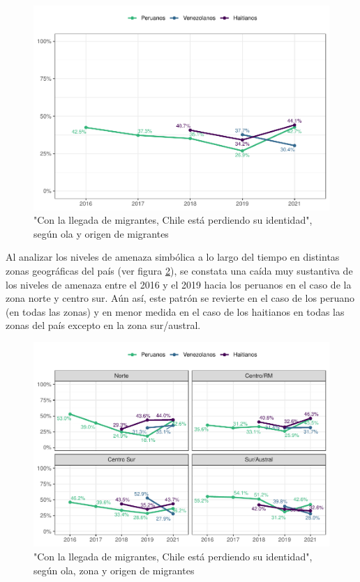 \documentclass[
  12pt,
]{book}
\begin{document}
\begin{figure}

{\centering \includegraphics{reporte-elsoc_files/figure-latex/amen2-wave-1} 

}

\caption{"Con la llegada de migrantes, Chile está perdiendo su identidad", según ola y origen de migrantes}\label{fig:amen2-wave}
\end{figure}

Al analizar los niveles de amenaza simbólica a lo largo del tiempo en distintas zonas geográficas del país (ver figura \ref{fig:amen2-zona}), se constata una caída muy sustantiva de los niveles de amenaza entre el 2016 y el 2019 hacia los peruanos en el caso de la zona norte y centro sur. Aún así, este patrón se revierte en el caso de los peruano (en todas las zonas) y en menor medida en el caso de los haitianos en todas las zonas del país excepto en la zona sur/austral.

\begin{figure}

{\centering \includegraphics{reporte-elsoc_files/figure-latex/amen2-zona-1} 

}

\caption{"Con la llegada de migrantes, Chile está perdiendo su identidad", según ola, zona y origen de migrantes}\label{fig:amen2-zona}
\end{figure}
\end{document}
